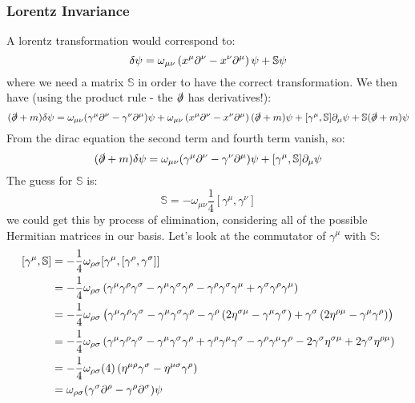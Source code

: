 \subsubsection{Lorentz Invariance}
A lorentz transformation would correspond to:
\begin{equation}
    \delta \psi = \omega_{\mu\nu}\left(x^\mu \partial^\nu - x^\nu \partial^\mu\right)\psi + \mathbb{S} \psi
\end{equation}
where we need a matrix $\mathbb{S}$ in order to have the correct transformation. We then have (using the product rule - the $\slashed{\partial}$ has derivatives!):
\begin{equation}
    (\slashed{\partial} + m)\delta \psi = \omega_{\mu\nu}(\gamma^\mu \partial^\nu - \gamma^\nu \partial^\mu)\psi + \omega_{\mu\nu}\left(x^\mu \partial^\nu - x^\nu \partial^\mu\right)(\slashed{\partial} + m)\psi + [\gamma^\mu, \mathbb{S}]\partial_\mu \psi + \mathbb{S}(\slashed{\partial} + m)\psi
\end{equation}
From the dirac equation the second term and fourth term vanish, so:
\begin{equation}
    (\slashed{\partial} + m)\delta \psi = \omega_{\mu\nu}(\gamma^\mu \partial^\nu - \gamma^\nu \partial^\mu)\psi + [\gamma^\mu, \mathbb{S}]\partial_\mu \psi
\end{equation}
The guess for $\mathbb{S}$ is:
\begin{equation}
    \mathbb{S} = -\omega_{\mu\nu}\frac{1}{4}[\gamma^\mu, \gamma^\nu]
\end{equation}
we could get this by process of elimination, considering all of the possible Hermitian matrices in our basis. Let's look at the commutator of $\gamma^\mu$ with $\mathbb{S}$:
\begin{equation}
    \begin{split}
        [\gamma^\mu, \mathbb{S}] &= -\frac{1}{4}\omega_{\rho\sigma}[\gamma^\mu, [\gamma^\rho, \gamma^\sigma]]
        \\ &= -\frac{1}{4}\omega_{\rho\sigma}\left(\gamma^\mu\gamma^\rho\gamma^\sigma - \gamma^\mu \gamma^\sigma \gamma^\rho - \gamma^\rho \gamma^\sigma \gamma^\mu + \gamma^\sigma \gamma^\rho \gamma^\mu\right)
        \\ &= -\frac{1}{4}\omega_{\rho\sigma}\left(\gamma^\mu\gamma^\rho\gamma^\sigma - \gamma^\mu \gamma^\sigma \gamma^\rho - \gamma^\rho \left(2\eta^{\sigma\mu} - \gamma^\mu \gamma^\sigma\right) + \gamma^\sigma \left(2\eta^{\rho\mu} - \gamma^\mu \gamma^\rho\right)\right)
        \\ &= -\frac{1}{4}\omega_{\rho\sigma}\left(\gamma^\mu\gamma^\rho\gamma^\sigma - \gamma^\mu \gamma^\sigma \gamma^\rho + \gamma^\rho \gamma^\mu \gamma^\sigma - \gamma^\rho \gamma^\mu \gamma^\rho - 2\gamma^\sigma \eta^{\sigma\mu} + 2\gamma^\sigma\eta^{\rho\mu}\right)
        \\ &= -\frac{1}{4}\omega_{\rho\sigma}(4)\left(\eta^{\mu\rho}\gamma^\sigma - \eta^{\mu\sigma}\gamma^\rho\right)
        \\ &= \omega_{\rho\sigma}(\gamma^\sigma\partial^\rho - \gamma^\rho \partial^\sigma)\psi
    \end{split}
\end{equation}
